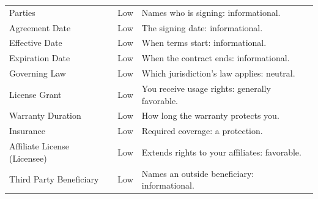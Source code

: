 \begin{longtable}{>{\raggedright\arraybackslash}p{4.6cm} c >{\raggedright\arraybackslash}p{7.6cm}}
Parties & \textcolor{risklow}{Low} & Names who is signing: informational.\\
Agreement Date & \textcolor{risklow}{Low} & The signing date: informational.\\
Effective Date & \textcolor{risklow}{Low} & When terms start: informational.\\
Expiration Date & \textcolor{risklow}{Low} & When the contract ends: informational.\\
Governing Law & \textcolor{risklow}{Low} & Which jurisdiction's law applies: neutral.\\
License Grant & \textcolor{risklow}{Low} & You receive usage rights: generally favorable.\\
Warranty Duration & \textcolor{risklow}{Low} & How long the warranty protects you.\\
Insurance & \textcolor{risklow}{Low} & Required coverage: a protection.\\
Affiliate License (Licensee) & \textcolor{risklow}{Low} & Extends rights to your affiliates: favorable.\\
Third Party Beneficiary & \textcolor{risklow}{Low} & Names an outside beneficiary: informational.\\
\bottomrule
\end{longtable}

